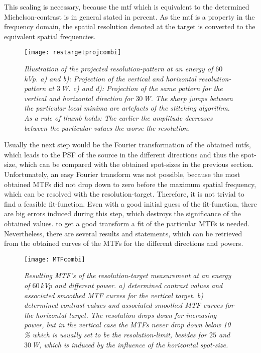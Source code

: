 This scaling is necessary, because the \gls{mtf} which is equivalent to the determined Michelson-contrast is in general stated in percent. As the \gls{mtf} is a property in the frequency domain, the spatial resolution denoted at the target is converted to the equivalent spatial frequencies.
\begin{figure}[h]
	\begin{center}
		\texttt{[image: restargetprojcombi]}
	\end{center}
	\caption[Illustration of the projected resolution-pattern for different power]{\textit{Illustration of the projected resolution-pattern at an energy of $60\,$kVp. a) and b): Projection of the vertical and horizontal resolution-pattern at $3\,$W. c) and d): Projection of the same pattern for the vertical and horizontal direction for $30\,$W. The sharp jumps between the particular local minima are artefacts of the stitching algorithm. As a rule of thumb holds: The earlier the amplitude decreases between the particular values the worse the resolution.}}
	\label{restargetproj}
\end{figure}
\clearpage
Usually the next step would be the Fourier transformation of the obtained \glspl{mtf}, which leads to the PSF of the source in the different directions and thus the spot-size, which can be compared with the obtained spot-sizes in  the previous section. Unfortunately, an easy Fourier transform was not possible, because the most obtained MTFs did not drop down to zero before the maximum spatial frequency, which can be resolved with the resolution-target. Therefore, it is not trivial to find a feasible fit-function. Even with a good initial guess of the fit-function, there are big errors induced during this step, which destroys the significance of the obtained values. to get a good transform a fit of the particular MTFs is needed. Nevertheless, there are several results and statements, which can be retrieved from the obtained curves of the MTFs for the different directions and powers.
\begin{figure}[h]
	\begin{center}
		\texttt{[image: MTFcombi]}
	\end{center}
	\caption[Obtained MTFs for different power at an energy of $60\,$kVp]{\textit{Resulting MTF's of the resolution-target measurement at an energy of $60\,$kVp and different power. a) determined contrast values and associated smoothed MTF curves for the vertical target. b) determined contrast values and associated smoothed MTF curves for the horizontal target. The resolution drops down for increasing power, but in the vertical case the MTFs never drop down below 10 \% which is usually set to be the resolution-limit, besides for $25$ and $30\,$W, which is induced by the influence of the horizontal spot-size.}}
	\label{mtfcombi}
\end{figure}  

